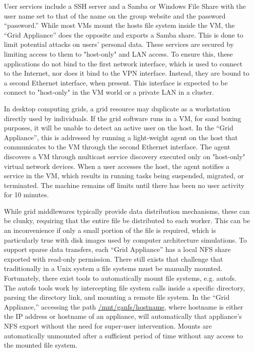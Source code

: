 \documentclass[conference]{IEEEtran}
\begin{document}
User services include a SSH server and a Samba or Windows File Share with the
user name set to that of the name on the group website and the password
``password.'' While most VMs mount the hosts file system inside the VM, the
``Grid Appliance'' does the opposite and exports a Samba share.  This is done
to limit potential attacks on users' personal data.  These services are secured
by limiting access to them to "host-only" and LAN access.  To ensure this,
these applications do not bind to the first network interface, which is used to
connect to the Internet, nor does it bind to the VPN interface.  Instead, they
are bound to a second Ethernet interface, when present.  This interface is
expected to be connect to "host-only" in the VM world or a private LAN in a
cluster.  

In desktop computing grids, a grid resource may duplicate as a workstation
directly used by individuals.  If the grid software runs in a VM, for sand
boxing purposes, it will be unable to detect an active user on the host.  In
the ``Grid Appliance'', this is addressed by running a light-weight agent on
the host that communicates to the VM through the second Ethernet interface.
The agent discovers a VM through multicast service discovery executed only on
"host-only" virtual network devices.  When a user accesses the host, the agent
notifies a service in the VM, which results in running tasks being suspended,
migrated, or terminated.  The machine remains off limits until there has been
no user activity for 10 minutes.

While grid middlewares typically provide data distribution mechanisms, these
can be clunky, requiring that the entire file be distributed to each worker.
This can be an inconvenience if only a small portion of the file is required,
which is particularly true with disk images used by computer architecture
simulations.  To support sparse data transfers, each ``Grid Appliance'' has a
local NFS share exported with read-only permission.  There still exists that
challenge that traditionally in a Unix system a file systems must be manually
mounted.  Fortunately, there exist tools to automatically mount file systems,
e.g.  autofs. The autofs tools work by intercepting file system calls inside a
specific directory, parsing the directory link, and mounting a remote file
system.  In the ``Grid Appliance,'' accessing the path
\url{/mnt/ganfs/hostname}, where hostname is either the IP address or hostname
of an appliance, will automatically that appliance's NFS export without the
need for super-user intervention.  Mounts are automatically unmounted after a
sufficient period of time without any access to the mounted file system.  
\end{document}
